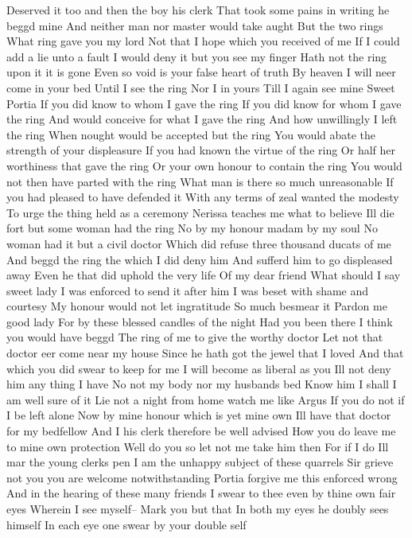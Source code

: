 Deserved it too and then the boy his clerk
That took some pains in writing he beggd mine
And neither man nor master would take aught
But the two rings
What ring gave you my lord
Not that I hope which you received of me
If I could add a lie unto a fault
I would deny it but you see my finger
Hath not the ring upon it it is gone
Even so void is your false heart of truth
By heaven I will neer come in your bed
Until I see the ring
Nor I in yours
Till I again see mine
Sweet Portia
If you did know to whom I gave the ring
If you did know for whom I gave the ring
And would conceive for what I gave the ring
And how unwillingly I left the ring
When nought would be accepted but the ring
You would abate the strength of your displeasure
If you had known the virtue of the ring
Or half her worthiness that gave the ring
Or your own honour to contain the ring
You would not then have parted with the ring
What man is there so much unreasonable
If you had pleased to have defended it
With any terms of zeal wanted the modesty
To urge the thing held as a ceremony
Nerissa teaches me what to believe
Ill die fort but some woman had the ring
No by my honour madam by my soul
No woman had it but a civil doctor
Which did refuse three thousand ducats of me
And beggd the ring the which I did deny him
And sufferd him to go displeased away
Even he that did uphold the very life
Of my dear friend What should I say sweet lady
I was enforced to send it after him
I was beset with shame and courtesy
My honour would not let ingratitude
So much besmear it Pardon me good lady
For by these blessed candles of the night
Had you been there I think you would have beggd
The ring of me to give the worthy doctor
Let not that doctor eer come near my house
Since he hath got the jewel that I loved
And that which you did swear to keep for me
I will become as liberal as you
Ill not deny him any thing I have
No not my body nor my husbands bed
Know him I shall I am well sure of it
Lie not a night from home watch me like Argus
If you do not if I be left alone
Now by mine honour which is yet mine own
Ill have that doctor for my bedfellow
And I his clerk therefore be well advised
How you do leave me to mine own protection
Well do you so let not me take him then
For if I do Ill mar the young clerks pen
I am the unhappy subject of these quarrels
Sir grieve not you you are welcome notwithstanding
Portia forgive me this enforced wrong
And in the hearing of these many friends
I swear to thee even by thine own fair eyes
Wherein I see myself--
Mark you but that
In both my eyes he doubly sees himself
In each eye one swear by your double self
